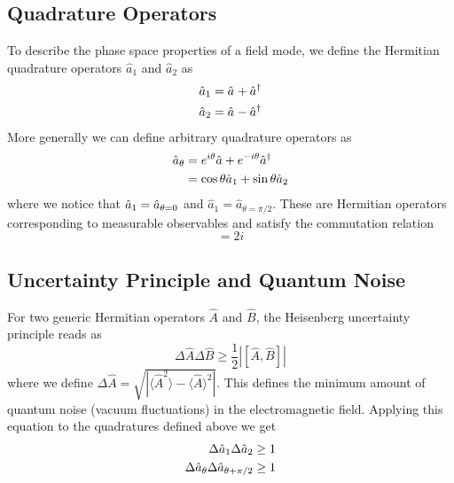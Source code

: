 \subsection*{Quadrature Operators}

To describe the phase space properties of a field mode, we define the Hermitian quadrature operators $\hat{a}_{1}$ and $\hat{a}_{2}$ as
\begin{equation}
  \begin{split}
    \hat{a}_{1} &= \hat{a}^{\vphantom{\dagger}} + \hat{a}^\dagger  \\
    \hat{a}_{2} &= \hat{a}^{\vphantom{\dagger}} - \hat{a}^\dagger
  \end{split}
\end{equation}
More generally we can define arbitrary quadrature operators as 
\begin{align}
  \hat{a}_{\theta} &= e^{i\theta}\hat{a}+ e^{-i\theta}\hat{a}^{\dagger} \notag \\ 
  & = \cos \theta \hat{a}_{1} + \sin \theta \hat{a}_{2}
\end{align}
where we notice that $\hat{a}_{1} = \hat{a}_{\theta=0\vphantom{\pi/2}}$ and $\hat{a}_{1} = \hat{a}_{\theta=\pi/2}$. These are Hermitian operators corresponding to measurable observables and satisfy the commutation relation
\begin{equation}
[a_{\theta \vphantom{\pi/2}}, a_{\theta+\pi/2}] = 2i
\end{equation}

\subsection*{Uncertainty Principle and Quantum Noise}

For two generic Hermitian operators $\hat{A}$ and $\hat{B}$, the Heisenberg uncertainty principle reads as 
\begin{equation}
  \Delta \hat{A}\Delta \hat{B} \geq \frac{1}{2} |[\hat{A}, \hat{B}]|
\end{equation}
where we define $\Delta \hat{A}=\sqrt{|\langle \hat{A}^2\rangle - \langle \hat{A} \rangle^2|}$. This defines the minimum amount of quantum noise (vacuum fluctuations) in the electromagnetic field.
Applying this equation to the quadratures defined above we get 
\begin{equation}
   \begin{split}
    \Delta \hat{a}_{1} \Delta \hat{a}_{2} &\geq 1 \\
    \Delta \hat{a}_{\theta \vphantom{\pi/2}} \Delta \hat{a}_{\theta +\pi/2} &\geq 1
   \end{split}
\end{equation}

